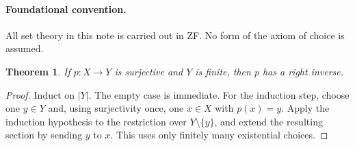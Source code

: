 \documentclass{article}
\newtheorem{theorem}{Theorem}
\begin{document}
\paragraph{Foundational convention.}
All set theory in this note is carried out in ZF. No form of the axiom of
choice is assumed.

\begin{theorem}\label{thm:finite-choice-right-inverse}
If $p:X\to Y$ is surjective and $Y$ is finite, then $p$ has a right inverse.
\end{theorem}
\begin{proof}
Induct on $|Y|$. The empty case is immediate. For the induction step, choose
one $y\in Y$ and, using surjectivity once, one $x\in X$ with $p(x)=y$.
Apply the induction hypothesis to the restriction over $Y\setminus\{y\}$,
and extend the resulting section by sending $y$ to $x$. This uses only
finitely many existential choices.
\end{proof}
\end{document}

